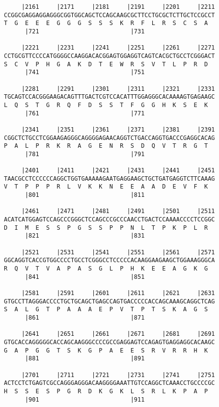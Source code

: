 \documentclass{article}
\begin{document}
\begin{Verbatim}
     |2161     |2171     |2181     |2191     |2201     |2211
CCGGCGAGGAGGAGGGCGGTGGCAGCTCCAGCAAGCGCTTCCTGCGCTCTTGCTCCGCCT
T  G  E  E  E  G  G  G  S  S  S  K  R  F  L  R  S  C  S  A  
      |721                          |731                    
  
     |2221     |2231     |2241     |2251     |2261     |2271
CCTGCGTTCCCCATGGGGCCAAGGACACGGAGTGGAGGTCAGTCACGCTGCCTCGGGACT
S  C  V  P  H  G  A  K  D  T  E  W  R  S  V  T  L  P  R  D  
      |741                          |751                    
  
     |2281     |2291     |2301     |2311     |2321     |2331
TGCAGTCCACGGGAAGACAGTTTGACTCGTCCACATTTGGAGGGCACAAAAGTGAGAAGC
L  Q  S  T  G  R  Q  F  D  S  S  T  F  G  G  H  K  S  E  K  
      |761                          |771                    
  
     |2341     |2351     |2361     |2371     |2381     |2391
CGGCTCTGCCTCGGAAGAGGGCAGGGGAGAACAGGTCTGACCAGGTGACCCGAGGCACAG
P  A  L  P  R  K  R  A  G  E  N  R  S  D  Q  V  T  R  G  T  
      |781                          |791                    
  
     |2401     |2411     |2421     |2431     |2441     |2451
TAACGCCTCCCCCCAGGCTGGTGAAAAAGAATGAGGAAGCTGCTGATGAGGTCTTCAAAG
V  T  P  P  P  R  L  V  K  K  N  E  E  A  A  D  E  V  F  K  
      |801                          |811                    
  
     |2461     |2471     |2481     |2491     |2501     |2511
ACATCATGGAGTCCAGCCCGGGCTCCAGCCCGCCCAACCTGACTCCAAAACCCCTCCGGC
D  I  M  E  S  S  P  G  S  S  P  P  N  L  T  P  K  P  L  R  
      |821                          |831                    
  
     |2521     |2531     |2541     |2551     |2561     |2571
GGCAGGTCACCGTGGCCCCTGCCTCGGGCCTCCCCCACAAGGAAGAAGCTGGAAAGGGCA
R  Q  V  T  V  A  P  A  S  G  L  P  H  K  E  E  A  G  K  G  
      |841                          |851                    
  
     |2581     |2591     |2601     |2611     |2621     |2631
GTGCCTTAGGGACCCCTGCTGCAGCTGAGCCAGTGACCCCCACCAGCAAAGCAGGCTCAG
S  A  L  G  T  P  A  A  A  E  P  V  T  P  T  S  K  A  G  S  
      |861                          |871                    
  
     |2641     |2651     |2661     |2671     |2681     |2691
GTGCACCAGGGGGCACCAGCAAGGGCCCCGCCGAGGAGTCCAGAGTGAGGAGGCACAAGC
G  A  P  G  G  T  S  K  G  P  A  E  E  S  R  V  R  R  H  K  
      |881                          |891                    
  
     |2701     |2711     |2721     |2731     |2741     |2751
ACTCCTCTGAGTCGCCAGGGAGGGACAAGGGGAAATTGTCCAGGCTCAAACCTGCCCCGC
H  S  S  E  S  P  G  R  D  K  G  K  L  S  R  L  K  P  A  P  
      |901                          |911                    
  

\end{Verbatim}
\end{document}
